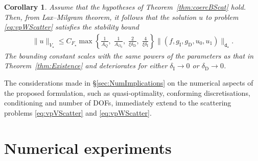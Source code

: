 \documentclass[a4paper]{article}
\theoremstyle{plain}
\newtheorem{corollary}[theorem]{Corollary}
\theoremstyle{definition}
\newcommand{\Vs}{{V_{\star}}}
\newcommand{\deltaI}{{\delta_{\mathrm I}}}
\newcommand{\deltaD}{{\delta_{\mathrm D}}}
\newcommand{\gD}{{g_{\mathrm D}}}
\newcommand{\gI}{{g_{\mathrm I}}}
\newcommand{\OZ}{{\Omega_0}}
\begin{document}
\begin{corollary}
Assume that the hypotheses of Theorem~\ref{thm:coercBScat} hold. Then, from Lax--Milgram theorem, it follows that the solution $u$ to problem \eqref{eq:vpWScatter} satisfies the stability bound
\begin{align*}
		\|u\|_\Vs \leq C_{F_\star}
		 \max\left\{\frac1{A_Q},\;\frac1{A_\OZ},\;\frac2{\xi\deltaD},\;\frac4{\xi\deltaI}\right\}\|(f, \gI,\gD,u_0,u_1)\|_{\mathtt{d}_\star}.
	\end{align*}
	The bounding constant scales with the same powers of the parameters as that in Theorem~\ref{thm:Existence} and deteriorates for either $\deltaI\to0$ or $\deltaD\to0$.
\end{corollary}

The considerations made in \S\ref{sec:NumImplications} on the numerical aspects of the proposed formulation, such as quasi-optimality, conforming discretisations, conditioning and number of DOFs, immediately extend to the scattering problems \eqref{eq:vpVScatter} and \eqref{eq:vpWScatter}.



\section{Numerical experiments}
\label{sec:numExperiments}
\end{document}
